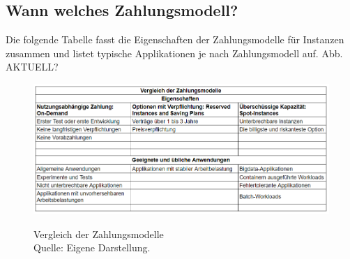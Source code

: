 \subsection{Wann welches Zahlungsmodell?} \label{sssec:num3.4}
Die folgende Tabelle fasst die Eigenschaften der Zahlungsmodelle für Instanzen zusammen und listet typische Applikationen je nach Zahlungsmodell auf.
Abb. AKTUELL?
\begin{figure}[h!]
    \centering
    \includegraphics[scale=0.6]{sources/Vergleich_der_Zahlungsmodelle}\label{fig:Vergleich_der_Zahlungsmodelle}\\
    \caption[Vergleich der Zahlungsmodelle]{}
    \label{fig:Vergleich_der_Zahlungsmodelle}  Vergleich der Zahlungsmodelle \\
    Quelle: Eigene Darstellung.
  \end{figure}


